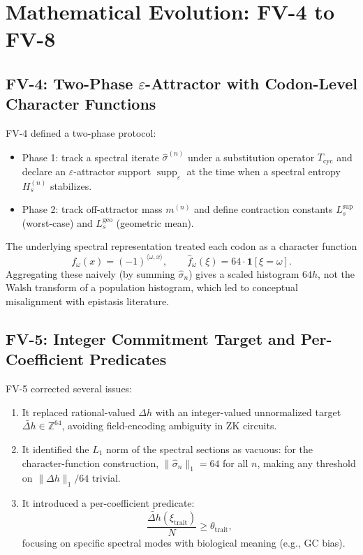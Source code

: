 \documentclass[11pt]{article}
\begin{document}
\section{Mathematical Evolution: FV-4 to FV-8}

\subsection{FV-4: Two-Phase $\varepsilon$-Attractor with Codon-Level Character Functions}

FV-4 defined a two-phase protocol:

\begin{itemize}[nosep]
  \item Phase 1: track a spectral iterate $\hat{\sigma}^{(n)}$ under a substitution operator $T_{\text{cyc}}$ and declare an $\varepsilon$-attractor support $\operatorname{supp}_\varepsilon$ at the time when a spectral entropy $H_s^{(n)}$ stabilizes.
  \item Phase 2: track off-attractor mass $m^{(n)}$ and define contraction constants $L_s^{\sup}$ (worst-case) and $L_s^{\text{geo}}$ (geometric mean).
\end{itemize}

The underlying spectral representation treated each codon as a character function
\[
f_\omega(x) = (-1)^{\langle \omega, x\rangle}, \qquad \hat{f}_\omega(\xi) = 64 \cdot \mathbf{1}[\xi = \omega].
\]
Aggregating these naively (by summing $\hat{\sigma}_n$) gives a scaled histogram $64h$, not the Walsh transform of a population histogram, which led to conceptual misalignment with epistasis literature.

\subsection{FV-5: Integer Commitment Target and Per-Coefficient Predicates}

FV-5 corrected several issues:

\begin{enumerate}[nosep]
  \item It replaced rational-valued $\Delta h$ with an integer-valued unnormalized target $\tilde{\Delta h} \in \mathbb{Z}^{64}$, avoiding field-encoding ambiguity in ZK circuits.
  \item It identified the $L_1$ norm of the spectral sections as vacuous: for the character-function construction, $\|\hat{\sigma}_n\|_1 = 64$ for all $n$, making any threshold on $\|\Delta h\|_1 / 64$ trivial.
  \item It introduced a per-coefficient predicate:
  \[
  \frac{\tilde{\Delta h}(\xi_{\text{trait}})}{N} \ge \theta_{\text{trait}},
  \]
  focusing on specific spectral modes with biological meaning (e.g., GC bias).
\end{enumerate}
\end{document}
